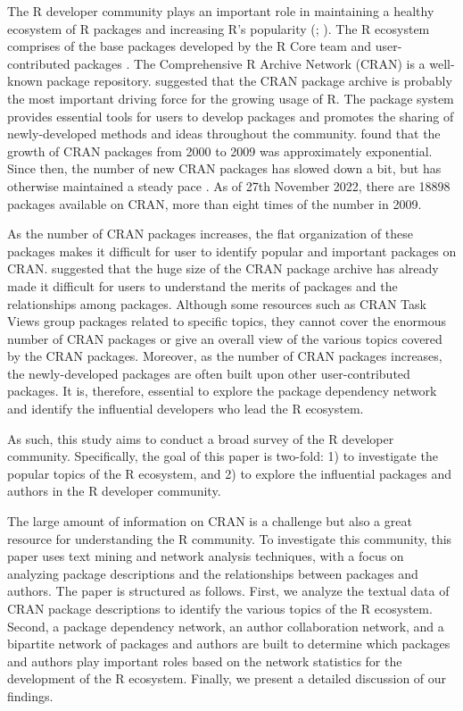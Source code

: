 The R developer community plays an important role in maintaining a healthy ecosystem of R packages and increasing R's popularity (\citealp{RJ-2020-028}; \citealp{tippmann2015programming}). The R ecosystem comprises of the base packages developed by the R Core team and user-contributed packages \citep{german2013evolution}. The Comprehensive R Archive Network (CRAN) is a well-known package repository. \citet{fox2009aspects} suggested that the CRAN package archive is probably the most important driving force for the growing usage of R. The package system provides essential tools for users to develop packages and promotes the sharing of newly-developed methods and ideas throughout the community. \citet{fox2009aspects} found that the growth of CRAN packages from 2000 to 2009 was approximately exponential. Since then, the number of new CRAN packages has slowed down a bit, but has otherwise maintained a steady pace \citep{fox2016r}.  As of 27th November 2022, there are 18898 packages available on CRAN, more than eight times of the number in 2009.


As the number of CRAN packages increases, the flat organization of these packages \citep{fox2016r} makes it difficult for user to identify popular and important packages on CRAN.  \citet{RJ-2018-058} suggested that the huge size of the CRAN package archive has already made it difficult for users to understand the merits of packages and the relationships among packages. Although some resources such as CRAN Task Views \citep{zeileis2005cran} group packages related to specific topics, they cannot cover the enormous number of CRAN packages or give an overall view of the various topics covered by the CRAN packages. Moreover, as the number of CRAN packages increases, the newly-developed packages are often built upon other user-contributed packages.  It is, therefore, essential to explore the package dependency network and identify the influential developers who lead the R ecosystem.


As such, this study aims to conduct a broad survey of the R developer community. Specifically, the goal of this paper is two-fold: 1) to investigate the popular topics of the R ecosystem, and 2) to explore the influential packages and authors in the R developer community.


The large amount of information on CRAN is a challenge but also a great resource for understanding the R community. To investigate this community, this paper uses text mining and network analysis techniques, with a focus on analyzing package descriptions and the relationships between packages and authors. The paper is structured as follows. First, we  analyze the textual data of CRAN package descriptions to identify the various topics of the R ecosystem. Second, a package dependency network, an author collaboration network, and a bipartite network of packages and authors are built to determine which packages and authors play important roles based on the network statistics for the development of the R ecosystem. Finally, we present a detailed discussion of our findings.




